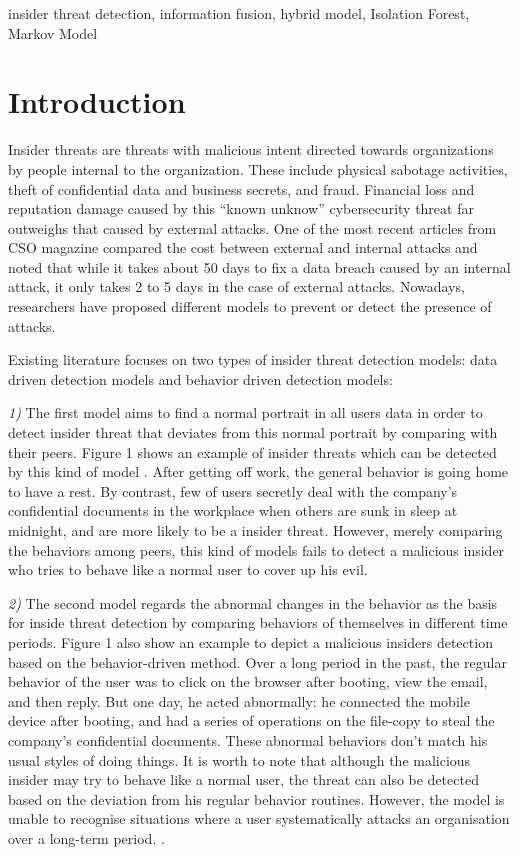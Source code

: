 \documentclass[conference]{IEEEtran}
\begin{document}
\begin{IEEEkeywords}
insider threat detection, information fusion, hybrid model, Isolation Forest, Markov Model
\end{IEEEkeywords}

\section{Introduction}

Insider threats are threats with malicious intent directed towards organizations by people internal to the organization\cite{b1}.
These include physical sabotage activities, theft of confidential data and business secrets, and fraud. Financial loss and reputation damage caused by this ``known unknow'' cybersecurity threat far outweighs that caused by external attacks. One of the most recent articles from CSO magazine\cite{b2} compared the cost between external and internal attacks and noted that while it takes about 50 days to fix a data breach caused by an internal attack, it only takes 2 to 5 days in the case of external attacks. Nowadays, researchers have proposed different models to prevent or detect the presence of attacks.

Existing literature focuses on two types of insider threat detection 
models: data driven detection models \cite{b3}\cite{b4} and behavior driven detection models\cite{b5}\cite{b6}: 

\noindent \emph{1)} The first model aims to find a normal portrait in all users data in order to detect insider threat that deviates from  this normal portrait by comparing with their peers\cite{b7}. Figure 1 shows an example of insider threats which can be detected by this kind of model \cite{b7}. After getting off work, the general behavior is going home to have a rest. By contrast, few of users secretly deal with the company's confidential documents in the workplace when others are sunk in sleep at midnight, and are more likely to be a insider threat. However, merely comparing the behaviors among peers,  this kind of models fails to detect a malicious insider who tries to behave like a normal user to cover up his evil.

\noindent \emph{2)} The second model regards the abnormal changes in the behavior as the basis for inside threat detection by comparing behaviors of themselves in different time periods.
Figure 1 also show an example to depict a malicious insiders detection based on the behavior-driven method\cite{b8}. Over a long period in the past, the regular behavior of the user was to click on the browser after booting, view the email, and then reply. But one day, he acted abnormally: he connected the mobile device after booting, and had a series of operations on the file-copy to steal the company's confidential documents. These abnormal behaviors don't match his usual styles of doing things. It is worth to note that although the malicious insider may try to behave like a normal user, the threat can also be detected based on the deviation from his regular behavior routines.
However, the model is unable to recognise situations where a user systematically attacks an
organisation over a long-term period. \cite{b3}. 
\end{document}
